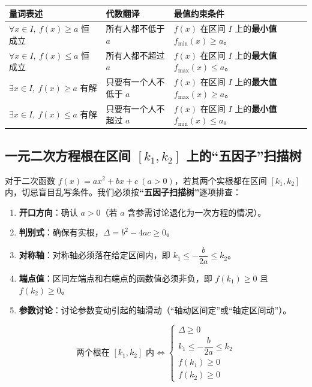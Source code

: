 \documentclass[11pt,a4paper]{ctexart}
\begin{document}
\begin{center}
\renewcommand{\arraystretch}{1.3}
\begin{tabularx}{\linewidth}{p{4.5cm} p{3.2cm} X}
\toprule
\textbf{量词表述} & \textbf{代数翻译} & \textbf{最值约束条件} \\
\midrule
$\forall x \in I,\ f(x) \ge a$ 恒成立 & 所有人都不低于 $a$ & $f(x)$ 在区间 $I$ 上的\textbf{最小值} $f_{\min}(x) \ge a$。 \\
$\forall x \in I,\ f(x) \le a$ 恒成立 & 所有人都不超过 $a$ & $f(x)$ 在区间 $I$ 上的\textbf{最大值} $f_{\max}(x) \le a$。 \\
$\exists x \in I,\ f(x) \ge a$ 有解 & 只要有一个人不低于 $a$ & $f(x)$ 在区间 $I$ 上的\textbf{最大值} $f_{\max}(x) \ge a$。 \\
$\exists x \in I,\ f(x) \le a$ 有解 & 只要有一个人不超过 $a$ & $f(x)$ 在区间 $I$ 上的\textbf{最小值} $f_{\min}(x) \le a$。 \\
\bottomrule
\end{tabularx}
\end{center}

\subsection{一元二次方程根在区间 $[k_1, k_2]$ 上的“五因子”扫描树}
对于二次函数 $f(x) = ax^2 + bx + c\ (a > 0)$，若其两个实根都在区间 $[k_1, k_2]$ 内，切忌盲目乱写条件。我们必须按\textbf{“五因子扫描树”}逐项排查：

\begin{enumerate}
  \item \textbf{开口方向}：确认 $a > 0$（若 $a$ 含参需讨论退化为一次方程的情况）。
  \item \textbf{判别式}：确保有实根，$\Delta = b^2 - 4ac \ge 0$。
  \item \textbf{对称轴}：对称轴必须落在给定区间内，即 $k_1 \le -\dfrac{b}{2a} \le k_2$。
  \item \textbf{端点值}：区间左端点和右端点的函数值必须非负，即 $f(k_1) \ge 0$ 且 $f(k_2) \ge 0$。
  \item \textbf{参数讨论}：讨论参数变动引起的轴滑动（“轴动区间定”或“轴定区间动”）。
\end{enumerate}

\[
\text{两个根在 } [k_1, k_2] \text{ 内} \iff 
\begin{cases}
  \Delta \ge 0 \\
  k_1 \le -\dfrac{b}{2a} \le k_2 \\
  f(k_1) \ge 0 \\
  f(k_2) \ge 0
\end{cases}
\]
\end{document}
